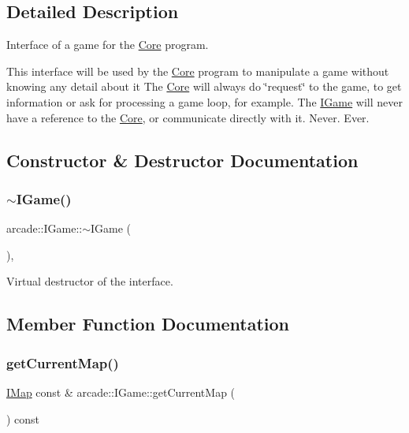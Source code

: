 \subsection{Detailed Description}
Interface of a game for the \hyperlink{classarcade_1_1_core}{Core} program. 

This interface will be used by the \hyperlink{classarcade_1_1_core}{Core} program to manipulate a game without knowing any detail about it The \hyperlink{classarcade_1_1_core}{Core} will always do \char`\"{}request\char`\"{} to the game, to get information or ask for processing a game loop, for example. The \hyperlink{classarcade_1_1_i_game}{I\+Game} will never have a reference to the \hyperlink{classarcade_1_1_core}{Core}, or communicate directly with it. Never. Ever. 

\subsection{Constructor \& Destructor Documentation}
\mbox{\label{classarcade_1_1_i_game_a89114f708822e3d0db5b58901c1e2354}} 
\subsubsection{\texorpdfstring{$\sim$\+I\+Game()}{~IGame()}}
{\footnotesize\ttfamily arcade\+::\+I\+Game\+::$\sim$\+I\+Game (\begin{DoxyParamCaption}{ }\end{DoxyParamCaption})\hspace{0.3cm}{\ttfamily [inline]}, {\ttfamily [virtual]}}



Virtual destructor of the interface. 



\subsection{Member Function Documentation}
\mbox{\label{classarcade_1_1_i_game_a2e1791071bf65ee35e249e409ee29044}} 
\subsubsection{\texorpdfstring{get\+Current\+Map()}{getCurrentMap()}}
{\footnotesize\ttfamily \hyperlink{classarcade_1_1_i_map}{I\+Map} const  \& arcade\+::\+I\+Game\+::get\+Current\+Map (\begin{DoxyParamCaption}{ }\end{DoxyParamCaption}) const\hspace{0.3cm}{\ttfamily [pure virtual]}}




